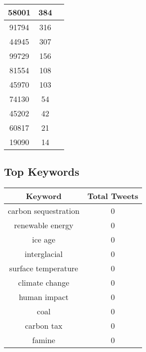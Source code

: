 \documentclass{article}\usepackage[T1]{fontenc}
\begin{document}
\begin{tabular}{|c|c|c|}
 \hline
58001 & 384\\ 
 \hline
91794 & 316\\ 
 \hline
44945 & 307\\ 
 \hline
99729 & 156\\ 
 \hline
81554 & 108\\ 
 \hline
45970 & 103\\ 
 \hline
74130 & 54\\ 
 \hline
45202 & 42\\ 
 \hline
60817 & 21\\ 
 \hline
19090 & 14\\ 
 \hline
\end{tabular}\subsection*{Top Keywords}\begin{tabular}{|c|c|}         \hline         Keyword & Total Tweets \\ 
 \hline
carbon sequestration & 0\\ 
 \hline
renewable energy & 0\\ 
 \hline
ice age & 0\\ 
 \hline
interglacial & 0\\ 
 \hline
surface temperature & 0\\ 
 \hline
climate change & 0\\ 
 \hline
human impact & 0\\ 
 \hline
coal & 0\\ 
 \hline
carbon tax & 0\\ 
 \hline
famine & 0\\ 
 \hline
\end{tabular}
\end{document}
